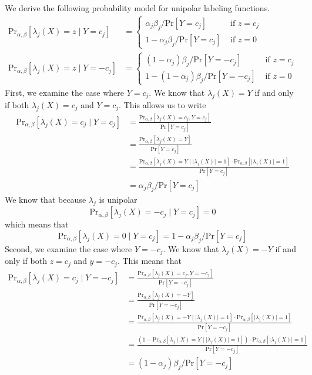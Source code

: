 We derive the following probability model for unipolar labeling functions.
\begin{align}
    \text{Pr}_{\alpha,\beta}[\lambda_j(X)=z\mid Y=c_j]&=\begin{cases}
        \alpha_j\beta_j/\text{Pr}[Y=c_j]&\text{ if }z=c_j\\
        1-\alpha_j\beta_j/\text{Pr}[Y=c_j]&\text{ if }z=0
    \end{cases}\\
    \text{Pr}_{\alpha,\beta}[\lambda_j(X)=z\mid Y=-c_j]&=\begin{cases}
        (1-\alpha_j)\beta_j/\text{Pr}[Y=-c_j]&\text{ if }z=c_j\\
        1-(1-\alpha_j)\beta_j/\text{Pr}[Y=-c_j]&\text{ if }z=0
    \end{cases}
\end{align}
First, we examine the case where $Y=c_j$. We know that $\lambda_j(X)=Y$ if and only if both $\lambda_j(X)=c_j$ and $Y=c_j$. This allows us to write
\begin{align*}
    \text{Pr}_{\alpha,\beta}[\lambda_j(X)=c_j\mid Y=c_j]&=\frac{\text{Pr}_{\alpha,\beta}[\lambda_j(X)=c_j, Y=c_j]}{\text{Pr}[Y=c_j]}\\
    &=\frac{\text{Pr}_{\alpha,\beta}[\lambda_j(X)=Y]}{\text{Pr}[Y=c_j]}\\
    &=\frac{\text{Pr}_{\alpha,\beta}[\lambda_j(X)=Y\mid\lvert \lambda_j(X)\rvert=1]\cdot\text{Pr}_{\alpha,\beta}[\lvert \lambda_j(X)\rvert=1]}{\text{Pr}[Y=c_j]}\\
    &=\alpha_j\beta_j/\text{Pr}[Y=c_j]
\end{align*}
We know that because $\lambda_j$ is unipolar
\begin{equation*}
    \text{Pr}_{\alpha,\beta}[\lambda_j(X)=-c_j\mid Y=c_j]=0
\end{equation*}
which means that
\begin{equation*}
    \text{Pr}_{\alpha,\beta}[\lambda_j(X)=0\mid Y=c_j]=1-\alpha_j\beta_j/\text{Pr}[Y=c_j]
\end{equation*}
Second, we examine the case where $Y=-c_j$. We know that $\lambda_j(X)=-Y$ if and only if both $z=c_j$ and $y=-c_j$. This means that
\begin{align*}
    \text{Pr}_{\alpha,\beta}[\lambda_j(X)=c_j\mid Y=-c_j]&=\frac{\text{Pr}_{\alpha,\beta}[\lambda_j(X)=c_j, Y=-c_j]}{\text{Pr}[Y=-c_j]}\\
    &=\frac{\text{Pr}_{\alpha,\beta}[\lambda_j(X)=-Y]}{\text{Pr}[Y=-c_j]}\\
    &=\frac{\text{Pr}_{\alpha,\beta}[\lambda_j(X)=-Y\mid\lvert \lambda_j(X)\rvert=1]\cdot\text{Pr}_{\alpha,\beta}[\lvert \lambda_j(X)\rvert=1]}{\text{Pr}[Y=-c_j]}\\
    &=\frac{(1-\text{Pr}_{\alpha,\beta}[\lambda_j(X)=Y\mid\lvert \lambda_j(X)\rvert=1])\cdot\text{Pr}_{\alpha,\beta}[\lvert \lambda_j(X)\rvert=1]}{\text{Pr}[Y=-c_j]}\\
    &=(1-\alpha_j)\beta_j/\text{Pr}[Y=-c_j]
\end{align*}
